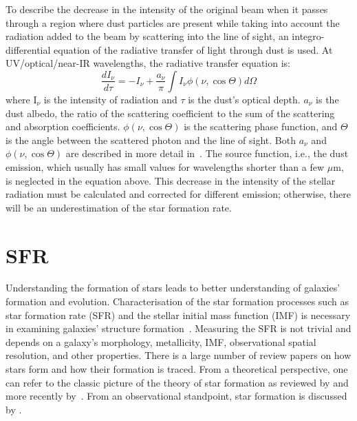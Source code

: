 To describe the decrease in the intensity of the original beam when it passes through a region where dust particles are present while taking into account the radiation added to the beam by scattering into the line of sight, an integro-differential equation of the radiative transfer of light through dust is used. %
At UV/optical/near-IR wavelengths, the radiative transfer equation is: %
\begin{equation}
\frac{dI_{\nu}}{d\tau} = -I_{\nu}  + \frac{a_{\nu}}{\pi} \int I_{\nu}\phi(\nu,\cos \Theta)d\Omega
\end{equation}
where I$_{\nu}$ is the intensity of radiation and $\tau$ is the dust's optical depth.
$a_{\nu}$ is the dust albedo,  the ratio of the scattering coefficient to the sum of the scattering and absorption coefficients. 
$\phi(\nu,\cos \Theta)$ is the scattering phase function, and $\Theta$ is the angle between the scattered photon and the line of sight. %
Both $a_{\nu}$ and $\phi(\nu,\cos \Theta)$ are described in more detail in~\citep{Draine03}. 
The source function, i.e., the dust emission, which usually has small values for wavelengths shorter than a few $\mu$m, is neglected in the equation above. %
This decrease in the intensity of the stellar radiation must be calculated and corrected for different emission; otherwise, there will be an underestimation of the star formation rate. %


\section{SFR} %
\label{sec: sfr_intro}
Understanding the formation of stars leads to better understanding of galaxies' formation and evolution. 
Characterisation of the star formation processes such as star formation rate (SFR) and the stellar initial mass function (IMF) is necessary in examining galaxies' structure formation~\citep{McKee07}. 
Measuring the SFR is not trivial and depends on a galaxy's morphology, metallicity, IMF, observational spatial resolution, and other properties. 
There is a large number of review papers on how stars form and how their formation is traced. 
From a theoretical perspective, one can refer to the classic picture of the theory of star formation as reviewed by \cite{Shu87} and more recently by~\citep{McKee07}. 
From an observational standpoint, star formation is discussed by \cite[][and references therein]{Kennicutt98b, Kewley02, Calzetti13, Boquien10, Kennicutt12}.


